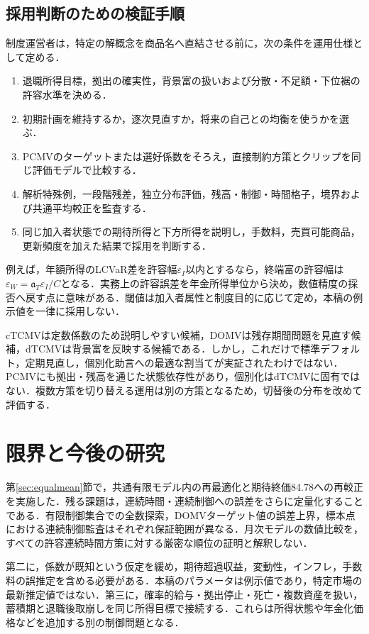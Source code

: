\documentclass[11pt,a4paper]{article}
\numberwithin{equation}{section}
\numberwithin{table}{section}
\numberwithin{figure}{section}
\theoremstyle{plain}
\theoremstyle{definition}
\begin{document}
\subsection{採用判断のための検証手順}
\label{sec:practice}
制度運営者は，特定の解概念を商品名へ直結させる前に，次の条件を運用仕様として定める．
\begin{enumerate}[leftmargin=2em,itemsep=3pt]
\item 退職所得目標，拠出の確実性，背景富の扱いおよび分散・不足額・下位裾の許容水準を決める．
\item 初期計画を維持するか，逐次見直すか，将来の自己との均衡を使うかを選ぶ．
\item PCMVのターゲットまたは選好係数をそろえ，直接制約方策とクリップを同じ評価モデルで比較する．
\item 解析特殊例，一段階残差，独立分布評価，残高・制御・時間格子，境界および共通平均較正を監査する．
\item 同じ加入者状態での期待所得と下方所得を説明し，手数料，売買可能商品，更新頻度を加えた結果で採用を判断する．
\end{enumerate}
例えば，年額所得のLCVaR差を許容幅$\varepsilon_I$以内とするなら，終端富の許容幅は$\varepsilon_W=\mathfrak a_T\varepsilon_I/C$となる．実務上の許容誤差を年金所得単位から決め，数値精度の採否へ戻す点に意味がある．閾値は加入者属性と制度目的に応じて定め，本稿の例示値を一律に採用しない．

cTCMVは定数係数のため説明しやすい候補，DOMVは残存期間問題を見直す候補，dTCMVは背景富を反映する候補である．しかし，これだけで標準デフォルト，定期見直し，個別化助言への最適な割当てが実証されたわけではない．PCMVにも拠出・残高を通じた状態依存性があり，個別化はdTCMVに固有ではない．複数方策を切り替える運用は別の方策となるため，切替後の分布を改めて評価する．

\FloatBarrier
\section{限界と今後の研究}
\label{sec:limits}
第\ref{sec:equalmean}節で，共通有限モデル内の再最適化と期待終価84.78への再較正を実施した．残る課題は，連続時間・連続制御への誤差をさらに定量化することである．有限制御集合での全数探索，DOMVターゲット値の誤差上界，標本点における連続制御監査はそれぞれ保証範囲が異なる．月次モデルの数値比較を，すべての許容連続時間方策に対する厳密な順位の証明と解釈しない．

第二に，係数が既知という仮定を緩め，期待超過収益，変動性，インフレ，手数料の誤推定を含める必要がある．本稿のパラメータは例示値であり，特定市場の最新推定値ではない．第三に，確率的給与・拠出停止・死亡・複数資産を扱い，蓄積期と退職後取崩しを同じ所得目標で接続する．これらは所得状態や年金化価格などを追加する別の制御問題となる．
\end{document}
